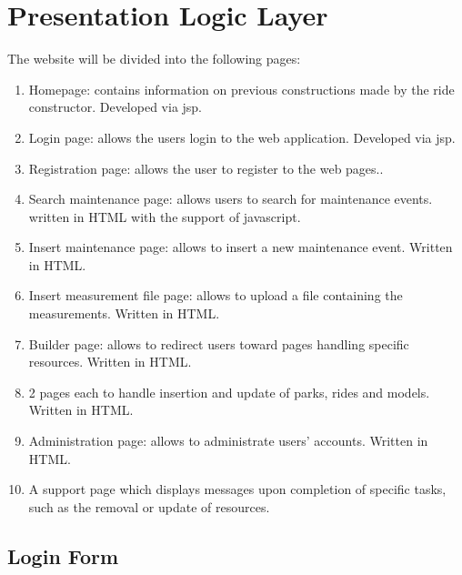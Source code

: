 \section{Presentation Logic Layer}
\graphicspath{ {./HW_1/images/} }

The website will be divided into the following pages:
\begin{enumerate}
    \item Homepage: contains information on previous constructions made by the ride constructor. Developed via
jsp.
    \item Login page: allows the users login to the web application. Developed via jsp.
    \item Registration page: allows the user to register to the web pages..
    \item Search maintenance page: allows users to search for maintenance events. written in HTML with the
support of javascript.
    \item Insert maintenance page: allows to insert a new maintenance event. Written in HTML.
    \item Insert measurement file page: allows to upload a file containing the measurements. Written in HTML.
    \item Builder page: allows to redirect users toward pages handling specific resources. Written in HTML.
    \item 2 pages each to handle insertion and update of parks, rides and models. Written in HTML.
    \item Administration page: allows to administrate users’ accounts. Written in HTML.
    \item A support page which displays messages upon completion of specific tasks, such as the removal or update
of resources.
\end{enumerate}

\subsection{Login Form}




















